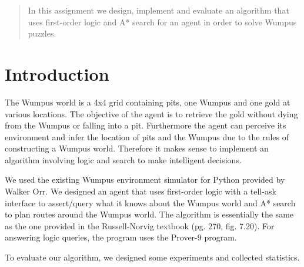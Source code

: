 \documentclass[12pt]{article}
\begin{document}
\maketitle

\begin{abstract}
In this assignment we design, implement and evaluate an algorithm that uses first-order logic and A* search for an agent in order to solve Wumpus puzzles.
\end{abstract}

\section{Introduction}

The Wumpus world is a 4x4 grid containing pits, one Wumpus and one gold at various locations. The objective of the agent is to retrieve the gold without dying from the Wumpus or falling into a pit. Furthermore the agent can perceive its environment and infer the location of pits and the Wumpus due to the rules of constructing a Wumpus world. Therefore it makes sense to implement an algorithm involving logic and search to make intelligent decisions.

We used the existing Wumpus environment simulator for Python provided by Walker Orr. We designed an agent that uses first-order logic with a tell-ask interface to assert/query what it knows about the Wumpus world and A* search to plan routes around the Wumpus world. The algorithm is essentially the same as the one provided in the Russell-Norvig textbook (pg. 270, fig. 7.20). For answering logic queries, the program uses the Prover-9 program.

To evaluate our algorithm, we designed some experiments and collected statistics.







\end{document}
